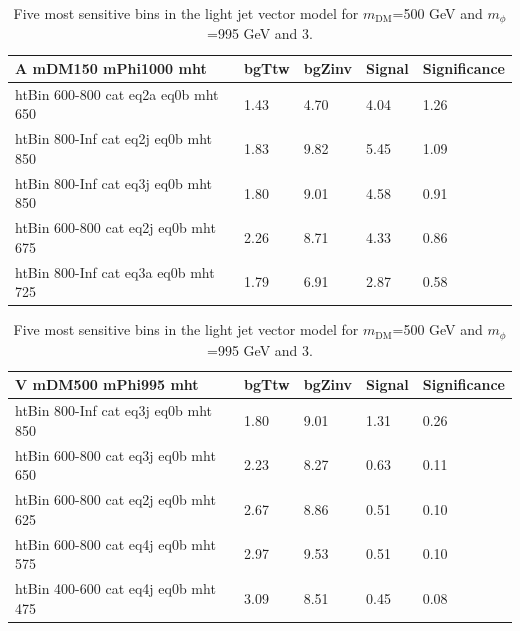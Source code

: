 \begin{table}[h!]
\begin{table}[h!]
  \centering
  \begin{tabular}{lllll}
    \hline
    \textbf{A mDM150 mPhi1000 mht} & bgTtw & bgZinv & Signal & Significance \\ \hline
    htBin 600-800 cat eq2a eq0b mht 650 & 1.43 & 4.70 & 4.04 &1.26 \\
    htBin 800-Inf cat eq2j eq0b mht 850 & 1.83 & 9.82 & 5.45 &1.09 \\
    htBin 800-Inf cat eq3j eq0b mht 850 & 1.80 & 9.01 & 4.58 &0.91 \\
    htBin 600-800 cat eq2j eq0b mht 675 & 2.26 & 8.71 & 4.33 &0.86 \\
    htBin 800-Inf cat eq3a eq0b mht 725 & 1.79 & 6.91 & 2.87 &0.58 \\
    \hline
  \end{tabular}
  \caption{Five most sensitive bins in the light jet axial-vector model for $m_\textrm{DM}$=150 GeV and $m_\phi$=1000 GeV and 3\fbinv. \label{tab:bestBins_A_3fb}}
\end {table}


\begin{table}[h!]
  \centering
  \begin{tabular}{lllll}
    \hline
    \textbf{V mDM500 mPhi995 mht} & bgTtw & bgZinv & Signal & Significance \\ \hline
    htBin 800-Inf cat eq3j eq0b mht 850 & 1.80 & 9.01 & 1.31 &0.26 \\
    htBin 600-800 cat eq3j eq0b mht 650 & 2.23 & 8.27 & 0.63 &0.11 \\
    htBin 600-800 cat eq2j eq0b mht 625 & 2.67 & 8.86 & 0.51 &0.10 \\
    htBin 600-800 cat eq4j eq0b mht 575 & 2.97 & 9.53 & 0.51 &0.10 \\
    htBin 400-600 cat eq4j eq0b mht 475 & 3.09 & 8.51 & 0.45 &0.08 \\
    \hline
  \end{tabular}
  \caption{Five most sensitive bins in the light jet vector model for $m_\textrm{DM}$=500 GeV and $m_\phi$=995 GeV and 3\fbinv. \label{tab:bestBins_V_3fb}}
\end {table}



\end{table}
